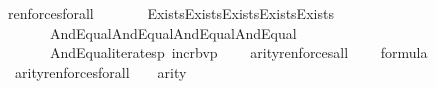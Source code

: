 \begin{isabellebody}
\ \ {\isachardoublequoteopen}ren{\isacharunderscore}{\kern0pt}forces{\isacharunderscore}{\kern0pt}forall{\isacharparenleft}{\kern0pt}{\isasymphi}{\isacharparenright}{\kern0pt}\ {\isasymequiv}\isanewline
\ \ \ \ \ \ Exists{\isacharparenleft}{\kern0pt}Exists{\isacharparenleft}{\kern0pt}Exists{\isacharparenleft}{\kern0pt}Exists{\isacharparenleft}{\kern0pt}Exists{\isacharparenleft}{\kern0pt}\isanewline
\ \ \ \ \ \ \ \ And{\isacharparenleft}{\kern0pt}Equal{\isacharparenleft}{\kern0pt}{}{\isacharcomma}{\kern0pt}{}{\isacharparenright}{\kern0pt}{\isacharcomma}{\kern0pt}And{\isacharparenleft}{\kern0pt}Equal{\isacharparenleft}{\kern0pt}{}{\isacharcomma}{\kern0pt}{}{\isacharparenright}{\kern0pt}{\isacharcomma}{\kern0pt}And{\isacharparenleft}{\kern0pt}Equal{\isacharparenleft}{\kern0pt}{}{\isacharcomma}{\kern0pt}{}{\isacharparenright}{\kern0pt}{\isacharcomma}{\kern0pt}And{\isacharparenleft}{\kern0pt}Equal{\isacharparenleft}{\kern0pt}{}{\isacharcomma}{\kern0pt}{}{\isacharparenright}{\kern0pt}{\isacharcomma}{\kern0pt}\isanewline
\ \ \ \ \ \ \ \ And{\isacharparenleft}{\kern0pt}Equal{\isacharparenleft}{\kern0pt}{}{\isacharcomma}{\kern0pt}{}{\isacharparenright}{\kern0pt}{\isacharcomma}{\kern0pt}iterates{\isacharparenleft}{\kern0pt}{\isasymlambda}p{\isachardot}{\kern0pt}\ incr{\isacharunderscore}{\kern0pt}bv{\isacharparenleft}{\kern0pt}p{\isacharparenright}{\kern0pt}{\isacharbackquote}{\kern0pt}{}\ {\isacharcomma}{\kern0pt}\ {}{\isacharcomma}{\kern0pt}\ {\isasymphi}{\isacharparenright}{\kern0pt}{\isacharparenright}{\kern0pt}{\isacharparenright}{\kern0pt}{\isacharparenright}{\kern0pt}{\isacharparenright}{\kern0pt}{\isacharparenright}{\kern0pt}{\isacharparenright}{\kern0pt}{\isacharparenright}{\kern0pt}{\isacharparenright}{\kern0pt}{\isacharparenright}{\kern0pt}{\isacharparenright}{\kern0pt}{\isachardoublequoteclose}\isanewline
\isanewline
{}\isamarkupfalse%
\ arity{\isacharunderscore}{\kern0pt}ren{\isacharunderscore}{\kern0pt}forces{\isacharunderscore}{\kern0pt}all\ {\isacharcolon}{\kern0pt}\isanewline
\ \ \ {\isachardoublequoteopen}{\isasymphi}{\isasymin}formula{\isachardoublequoteclose}\isanewline
\ \ \ {\isachardoublequoteopen}arity{\isacharparenleft}{\kern0pt}ren{\isacharunderscore}{\kern0pt}forces{\isacharunderscore}{\kern0pt}forall{\isacharparenleft}{\kern0pt}{\isasymphi}{\isacharparenright}{\kern0pt}{\isacharparenright}{\kern0pt}\ {\isacharequal}{\kern0pt}\ {}\ {\isasymunion}\ arity{\isacharparenleft}{\kern0pt}{\isasymphi}{\isacharparenright}{\kern0pt}{\isachardoublequoteclose}\isanewline

\end{isabellebody}
